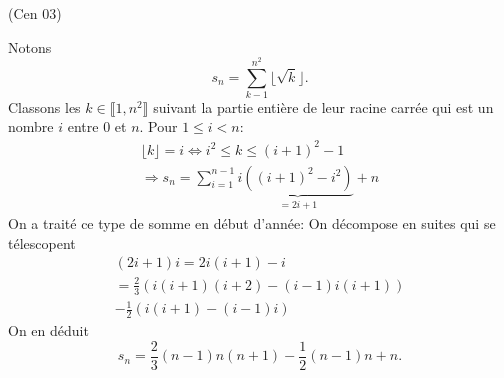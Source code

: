\begin{tiny}(Cen 03)\end{tiny} Notons
\[
  s_n = \sum_{k - 1}^{n^2} \lfloor \sqrt{k} \rfloor.
\]
Classons les $k\in \llbracket 1, n^2 \rrbracket$ suivant la partie entière de leur racine carrée qui est un nombre $i$ entre $0$ et $n$.\newline
Pour $1 \leq i < n$:
\begin{multline*}
  \lfloor k \rfloor = i \Leftrightarrow i^2 \leq k \leq (i+1)^2 - 1 \\
  \Rightarrow
  s_n = 
  \sum_{i = 1}^{n-1}i \underset{=2i + 1}{\underbrace{\left((i+1)^2 - i^2\right)}} + n
\end{multline*}
On a traité ce type de somme en début d'année:
On décompose en suites qui se télescopent
\begin{multline*}
  (2i+1)i 
  = 2i(i+1) - i\\
  =\frac{2}{3}\left( i(i+1)(i+2) -(i-1)i(i+1)\right) \\ 
  -\frac{1}{2}\left(i(i+1) - (i-1)i\right)
\end{multline*}
On en déduit
\[
  s_n
  = \frac{2}{3}(n-1)n(n+1) -\frac{1}{2}(n-1)n + n.
\]
